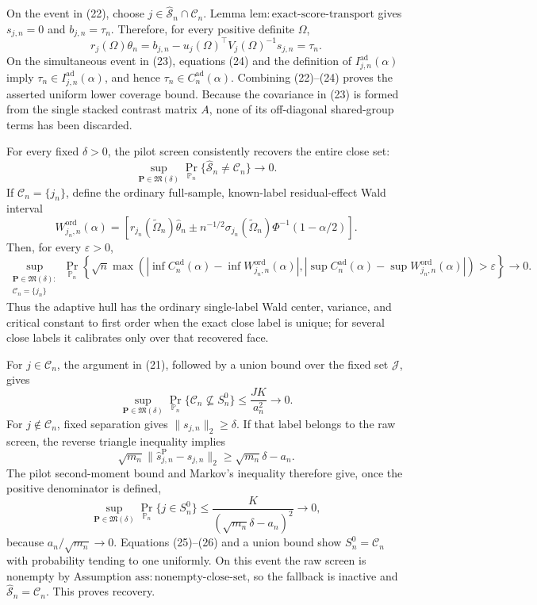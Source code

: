 On the event in (22), choose \(j\in\widehat{\mathcal S}_n\cap\mathcal C_n\).  Lemma \(\mathrm{lem:exact\text{-}score\text{-}transport}\) gives \(s_{j,n}=0\) and \(b_{j,n}=\tau_n\).  Therefore, for every positive definite \(\Omega\),
\[
 r_j(\Omega)\theta_n
 =b_{j,n}-u_j(\Omega)^{\top}V_j(\Omega)^{-1}s_{j,n}
 =\tau_n.
\tag{24}
\]
On the simultaneous event in (23), equations (24) and the definition of \(I_{j,n}^{\mathrm{ad}}(\alpha)\) imply \(\tau_n\in I_{j,n}^{\mathrm{ad}}(\alpha)\), and hence \(\tau_n\in C_n^{\mathrm{ad}}(\alpha)\).  Combining (22)--(24) proves the asserted uniform lower coverage bound.  Because the covariance in (23) is formed from the single stacked contrast matrix \(A\), none of its off-diagonal shared-group terms has been discarded.

For every fixed \(\delta>0\), the pilot screen consistently recovers the entire close set:
\[
 \sup_{\mathbf P\in\mathfrak M(\delta)}
 \Pr_{\mathbb P_n}\{\widehat{\mathcal S}_n\ne\mathcal C_n\}
 \longrightarrow0.
\]
If \(\mathcal C_n=\{j_n\}\), define the ordinary full-sample, known-label residual-effect Wald interval
\[
 W_{j_n,n}^{\mathrm{ord}}(\alpha)
 =\left[
 r_{j_n}(\widetilde\Omega_n)\widehat\theta_n
 \mathbin{\pm}n^{-1/2}\sigma_{j_n}(\widetilde\Omega_n)
 \Phi^{-1}(1-\alpha/2)
 \right].
\]
Then, for every \(\varepsilon>0\),
\[
 \sup_{\substack{\mathbf P\in\mathfrak M(\delta):\\
                   \mathcal C_n=\{j_n\}}}
 \Pr_{\mathbb P_n}\!\left\{
 \sqrt n\max\left(
  \left|\inf C_n^{\mathrm{ad}}(\alpha)-\inf W_{j_n,n}^{\mathrm{ord}}(\alpha)\right|,
  \left|\sup C_n^{\mathrm{ad}}(\alpha)-\sup W_{j_n,n}^{\mathrm{ord}}(\alpha)\right|
 \right)>\varepsilon
 \right\}\longrightarrow0.
\]
Thus the adaptive hull has the ordinary single-label Wald center, variance, and critical constant to first order when the exact close label is unique; for several close labels it calibrates only over that recovered face.

For \(j\in\mathcal C_n\), the argument in (21), followed by a union bound over the fixed set \(\mathcal J\), gives
\[
 \sup_{\mathbf P\in\mathfrak M(\delta)}
 \Pr_{\mathbb P_n}\{\mathcal C_n\nsubseteq S_n^0\}
 \le \frac{JK}{a_n^2}\longrightarrow0.
\tag{25}
\]
For \(j\notin\mathcal C_n\), fixed separation gives \(\|s_{j,n}\|_2\ge\delta\).  If that label belongs to the raw screen, the reverse triangle inequality implies
\[
 \sqrt{m_n}\|\widehat s_{j,n}^{\mathrm P}-s_{j,n}\|_2
 \ge \sqrt{m_n}\delta-a_n.
\]
The pilot second-moment bound and Markov's inequality therefore give, once the positive denominator is defined,
\[
 \sup_{\mathbf P\in\mathfrak M(\delta)}
 \Pr_{\mathbb P_n}\{j\in S_n^0\}
 \le \frac K{(\sqrt{m_n}\delta-a_n)^2}\longrightarrow0,
\tag{26}
\]
because \(a_n/\sqrt{m_n}\to0\).  Equations (25)--(26) and a union bound show \(S_n^0=\mathcal C_n\) with probability tending to one uniformly.  On this event the raw screen is nonempty by Assumption \(\mathrm{ass:nonempty\text{-}close\text{-}set}\), so the fallback is inactive and \(\widehat{\mathcal S}_n=\mathcal C_n\).  This proves recovery.

